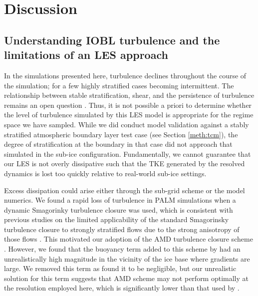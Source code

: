 \documentclass[draft]{agujournal2019}
\begin{document}
\section{Discussion}\label{disc}

\subsection{Understanding IOBL turbulence and the limitations of an LES approach} \label{disc:dyn}

In the simulations presented here, turbulence declines throughout the course of the simulation; for a few highly stratified cases becoming intermittent. The relationship between stable stratification, shear, and the persistence of turbulence remains an open question \cite{zonta_stably_2018}. Thus, it is not possible a priori to determine whether the level of turbulence simulated by this LES model is appropriate for the regime space we have sampled. While we did conduct model validation against a stably stratified atmospheric boundary layer test case (see Section \ref{meth:tcm}), the degree of stratification at the boundary in that case did not approach that simulated in the sub-ice configuration. Fundamentally, we cannot guarantee that our LES is not overly dissipative such that the TKE generated by the resolved dynamics is lost too quickly relative to real-world sub-ice settings. 

Excess dissipation could arise either through the sub-grid scheme or the model numerics. We found a rapid loss of turbulence in PALM simulations when a dynamic Smagorinky turbulence closure was used, which is consistent with previous studies on the limited applicability of the standard Smagorinsky turbulence closure to strongly stratified flows due to the strong anisotropy of those flows \cite{flores_analysis_2011, jimenez_large-eddy_2005}. This motivated our adoption of the AMD turbulence closure scheme \cite{abkar_minimum-dissipation_2016}. However, we found that the buoyancy term added to this scheme by  had an unrealistically high magnitude in the vicinity of the ice base where gradients are large. We removed this term as  found it to be negligible, but our unrealistic solution for this term suggests that AMD scheme may not perform optimally at the resolution employed here, which is significantly lower than that used by . 
\end{document}
